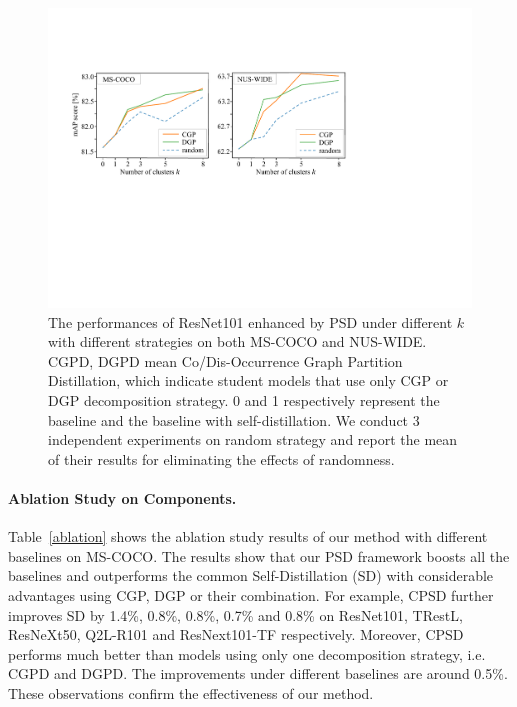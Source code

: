 \documentclass{article}
\begin{document}
\begin{figure}[t]
    \centering
    \includegraphics[width=1\columnwidth]{figure/ablation.pdf}
    \vspace{-0.6cm}
    \caption{The performances of ResNet101 enhanced by PSD under different $k$ with different strategies on both MS-COCO and NUS-WIDE.
    CGPD, DGPD mean Co/Dis-Occurrence Graph Partition Distillation, which indicate student models that use only CGP or DGP decomposition strategy.
    0 and 1 respectively represent the baseline and the baseline with self-distillation.
    We conduct 3 independent experiments on random strategy and report the mean of their results for eliminating the effects of randomness.
    }
    \label{fig3}
    \vspace{-0.2cm}
\end{figure}

\paragraph{Ablation Study on Components.} Table~\ref{ablation} shows the ablation study results of our method with different baselines on MS-COCO.
The results show that our PSD framework boosts all the baselines and outperforms the common Self-Distillation (SD) with considerable advantages using CGP, DGP or their combination.
For example, CPSD further improves SD by 1.4\%, 0.8\%, 0.8\%, 0.7\% and 0.8\% on ResNet101, TRestL, ResNeXt50, Q2L-R101 and ResNext101-TF respectively.
Moreover, CPSD performs much better than models using only one decomposition strategy, i.e. CGPD and DGPD.
The improvements under different baselines are around 0.5\%. These observations confirm the effectiveness of our method.
\end{document}
